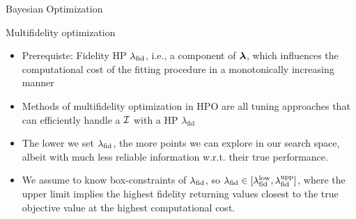 \documentclass[11pt,compress,t,notes=noshow, xcolor=table]{beamer}
\begin{document}
\begin{vbframe}{Bayesian Optimization}
\end{vbframe}


\begin{vbframe}{Multifidelity optimization}
\begin{itemize}
\item Prerequiste: Fidelity  HP $\lambda_{\text{fid}}$, i.e.,  a  component  of $\bm{\lambda}$,  which  influences  the computational  cost  of  the  fitting  procedure  in  a  monotonically  increasing  manner
\item Methods of multifidelity optimization in HPO are all tuning  approaches  that  can  efficiently handle  a $\mathcal{I}$ with  a  HP $\lambda_{\text{fid}}$
\item The  lower  we  set $\lambda_{\text{fid}}$,  the more points we can explore in our search space, albeit with much less reliable information w.r.t. their true performance.
\item We  assume  to  know  box-constraints  of $\lambda_{\text{fid}}$,  so $\lambda_{\text{fid}} \in [\lambda_{\text{fid}}^{\textrm{low}}, \lambda_{\text{fid}}^{\textrm{upp}}]$,  where  the  upper  limit  implies  the  highest  fidelity  returning  values closest to the true objective value at the highest computational cost. 
\end{itemize}
\end{vbframe}
\end{document}
